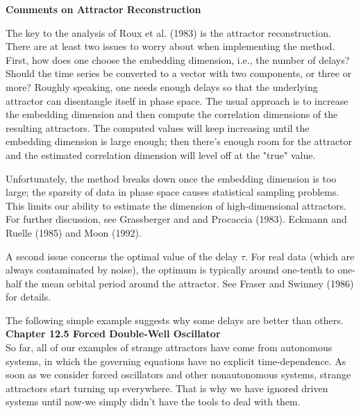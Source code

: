 \documentclass{article}
\newcommand\tab[1][1cm]{\hspace*{#1}}
\begin{document}
\textbf {Comments on Attractor Reconstruction} \\ \tab

The key to the analysis of Roux et al. (1983) is the attractor reconstruction. There are at least two issues to worry about when implementing the method. \\ \tab
First, how does one choose the embedding dimension, i.e., the number of delays? Should the time series be converted to a vector with two components, or three or more? Roughly speaking, one needs enough delays so that the underlying attractor can disentangle itself in phase space. The usual approach is to increase the embedding dimension and then compute the correlation dimensions of the resulting attractors. The computed values will keep increasing until the embedding dimension is large enough; then there's enough room for the attractor and the estimated correlation dimension will level off at the "true" value. \\ \tab

Unfortunately, the method breaks down once the embedding dimension is too large; the sparsity of data in phase space causes statistical sampling problems. This limits our ability to estimate the dimension of high-dimensional attractors. For further discussion, see Grassberger and and Procaccia (1983). Eckmann and Ruelle (1985) and Moon (1992). \\ \tab

A second issue concerns the optimal value of the delay $\tau$. For real data (which are always contaminated by noise), the optimum is typically around one-tenth to one-half the mean orbital period around the attractor. See Fraser and Swinney (1986) for details. \\ \tab

The following simple example suggests why some delays are better than others.  \\

 \textbf {Chapter 12.5 Forced Double-Well Oscillator} \\

So far, all of our examples of strange attractors have come from autonomous systems, in which the governing equations have no explicit time-dependence. As soon as we consider forced oscillators and other nonautonomous systems, strange attractors start turning up everywhere. That is why we have ignored driven systems until now-we simply didn't have the tools to deal with them. \\ \tab
\end{document}
